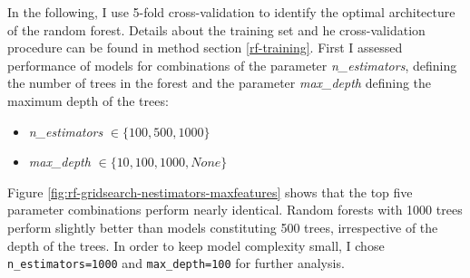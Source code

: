 \documentclass[11pt,a4paper,twoside]{book}
\providecommand{\tightlist}{%
  \setlength{\itemsep}{0pt}\setlength{\parskip}{0pt}}
\theoremstyle{definition}
\theoremstyle{definition}
\theoremstyle{remark}
\begin{document}
In the following, I use 5-fold cross-validation to identify the optimal
architecture of the random forest. Details about the training set and he
cross-validation procedure can be found in method section
\ref{rf-training}. First I assessed performance of models for
combinations of the parameter \emph{n\_estimators}, defining the number
of trees in the forest and the parameter \emph{max\_depth} defining the
maximum depth of the trees:

\begin{itemize}
\tightlist
\item
  \emph{n\_estimators} \(\in \{100,500,1000\}\)
\item
  \emph{max\_depth} \(\in \{10, 100, 1000, None\}\)
\end{itemize}

Figure \ref{fig:rf-gridsearch-nestimators-maxfeatures} shows that the
top five parameter combinations perform nearly identical. Random forests
with 1000 trees perform slightly better than models constituting 500
trees, irrespective of the depth of the trees. In order to keep model
complexity small, I chose \texttt{n\_estimators=1000} and
\texttt{max\_depth=100} for further analysis.
\end{document}
